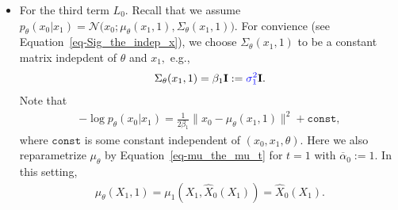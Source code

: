 \documentclass[
]{article}
\theoremstyle{remark}
\begin{document}
\begin{itemize}
  (2023)). DDPM chooses to predict the noise
  \(\overline{\mathcal{E}}_t.\) That is, we use
  \(\mathtt{Net}_{\theta}(X_t,t)\) to be the character of
  \(\widehat{\overline{\mathcal{E}_t}}\) in
  Equation~\ref{eq-estimator-X0} and then we have the following relation
  \begin{equation}\phantomsection\label{eq-Net_asssume1}{
  \begin{aligned}
    X_t = \sqrt{\overline{\alpha}_t} \cdot \widehat{X}_0(X_t) + \sqrt{1-\overline{\alpha}_t} \cdot \mathtt{Net}_{\theta}(X_t,t).
  \end{aligned}
  }\end{equation} Note that
  \(\widehat{X}_0 = \widehat{X}_0(X_t)=\widehat{X}_0(X_t,\theta).\)
  Hence, we have \[
  \begin{aligned}
    L_{t-1} = \mathbb E_{\substack{X_0\sim q(x_0), \overline{\mathcal{E}}_t\sim \mathcal{N}(\mathbf{0},\mathbf{I})\\ X_0,\overline{\mathcal{E}}_t \text{ are independent} \\ X_t=\sqrt{\overline{\alpha}_t}X_0+\sqrt{1-\overline{\alpha}_t}\cdot \overline{\mathcal{E}}_t}} \biggl( \frac{\beta_t^2}{2\sigma_t^2\alpha_t(1-\overline{\alpha}_t)} \Big\lVert \overline{\mathcal{E}}_t - \mathtt{Net}_{\theta}(X_t,t) \Big\rVert^2 \biggr).
  \end{aligned}
  \]
\item
  For the third term \(L_0.\) Recall that we assume
  \(p_{\theta}(x_0 \vert x_1) = \mathcal{N}\bigl(x_0; \mu_{\theta}(x_1,1), \Sigma_{\theta}(x_1,1) \bigr).\)
  For convience (see Equation~\ref{eq-Sig_the_indep_x}), we choose
  \(\Sigma_{\theta}(x_1,1)\) to be a constant matrix indepdent of
  \(\theta\) and \(x_1,\) e.g., \[
  \begin{aligned}
    \Sigma_{\theta}(x_1,1) = \beta_1 \mathbf{I}:={\color{blue}{\sigma_1^2}} \mathbf{I}.
  \end{aligned}
  \] Note that \[
  \begin{aligned}
    -\log p_{\theta} (x_0\vert x_1) = \frac{1}{2\beta_1} \big\lVert x_0 - \mu_{\theta}(x_1,1) \big\rVert^2 + \mathtt{const} ,
  \end{aligned}
  \] where \(\mathtt{const}\) is some constant independent of
  \((x_0,x_1,\theta).\) Here we also reparametrize \(\mu_{\theta}\) by
  Equation~\ref{eq-mu_the_mu_t} for \(t=1\) with
  \(\overline{\alpha}_0:=1.\) In this setting, \[
  \begin{aligned}
    \mu_\theta(X_1,1)=\mu_1(X_1,\widehat{X}_0(X_1))=\widehat{X}_0(X_1).
  \end{aligned}
\]
\end{itemize}
\end{document}
